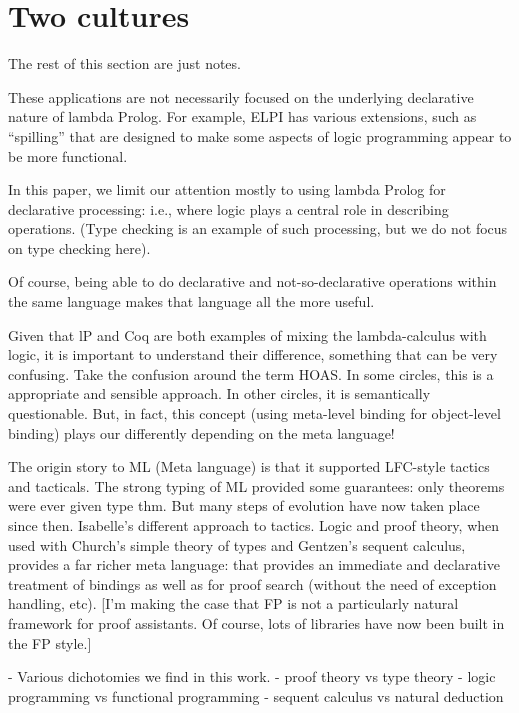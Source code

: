 \documentclass[a4paper,USenglish,cleveref, autoref, thm-restate]{lipics-v2019}
\begin{document}
\section{Two cultures}

{\color{red} The rest of this section are just notes.}

These applications are not necessarily focused on the underlying
declarative nature of lambda Prolog.  For example, ELPI has various
extensions, such as ``spilling'' that are designed to make some
aspects of logic programming appear to be more functional.

In this paper, we limit our attention mostly to using lambda Prolog
for declarative processing: i.e., where logic plays a central role in
describing operations.  (Type checking is an example of such
processing, but we do not focus on type checking here).

Of course, being able to do declarative and not-so-declarative
operations within the same language makes that language all the more
useful.


  Given that lP and Coq are both examples of mixing the
  lambda-calculus with logic, it is important to understand their
  difference, something that can be very confusing.  Take the
  confusion around the term HOAS.  In some circles, this is a
  appropriate and sensible approach.  In other circles, it is
  semantically questionable.  But, in fact, this concept (using
  meta-level binding for object-level binding) plays our 
  differently depending on the meta language!

  The origin story to ML (Meta language) is that it supported
  LFC-style tactics and tacticals.  The strong typing of ML provided
  some guarantees: only theorems were ever given type thm.  But many
  steps of evolution have now taken place since then.  Isabelle's
  different approach to tactics.  Logic and proof theory, when used
  with Church's simple theory of types and Gentzen's sequent calculus,
  provides a far richer meta language: that provides an immediate and
  declarative treatment of bindings as well as for proof search
  (without the need of exception handling, etc).  [I'm making the case
  that FP is not a particularly natural framework for proof
  assistants.  Of course, lots of libraries have now been built in the
  FP style.]
  
  - Various dichotomies we find in this work.
    - proof theory vs type theory
    - logic programming vs functional programming
    - sequent calculus vs natural deduction
\end{document}
